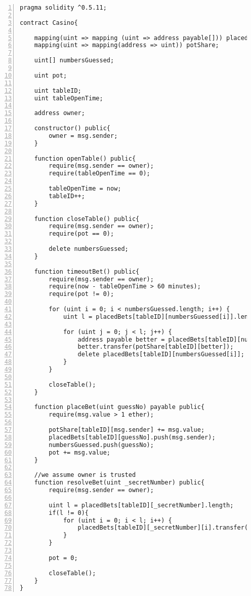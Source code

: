 \documentclass{article}
\begin{document}
  \small\begin{lstlisting}[language=DEA,basicstyle=\scriptsize,numbers=left,numbersep=2pt,xleftmargin=0.3cm,escapechar=\%,label={code:casino}]
pragma solidity ^0.5.11;

contract Casino{

    mapping(uint => mapping (uint => address payable[])) placedBets;
    mapping(uint => mapping(address => uint)) potShare;

    uint[] numbersGuessed;
    
    uint pot;

    uint tableID;
    uint tableOpenTime;

    address owner;

    constructor() public{
        owner = msg.sender;
    }

    function openTable() public{
        require(msg.sender == owner);
        require(tableOpenTime == 0);

        tableOpenTime = now;
        tableID++;
    }

    function closeTable() public{
        require(msg.sender == owner);
        require(pot == 0);

        delete numbersGuessed;
    }

    function timeoutBet() public{
        require(msg.sender == owner);
        require(now - tableOpenTime > 60 minutes);
        require(pot != 0);
        
        for (uint i = 0; i < numbersGuessed.length; i++) {
            uint l = placedBets[tableID][numbersGuessed[i]].length;

            for (uint j = 0; j < l; j++) {
                address payable better = placedBets[tableID][numbersGuessed[i]][l];
                better.transfer(potShare[tableID][better]);
                delete placedBets[tableID][numbersGuessed[i]];
            }
        }

        closeTable();
    }

    function placeBet(uint guessNo) payable public{
        require(msg.value > 1 ether);

        potShare[tableID][msg.sender] += msg.value;
        placedBets[tableID][guessNo].push(msg.sender);
        numbersGuessed.push(guessNo);
        pot += msg.value;
    }

    //we assume owner is trusted
    function resolveBet(uint _secretNumber) public{
        require(msg.sender == owner);

        uint l = placedBets[tableID][_secretNumber].length;
        if(l != 0){
            for (uint i = 0; i < l; i++) {
                placedBets[tableID][_secretNumber][i].transfer(pot/l);
            }
        }

        pot = 0;

        closeTable();
    }
}
      \end{lstlisting}\normalsize
      
\end{document}
